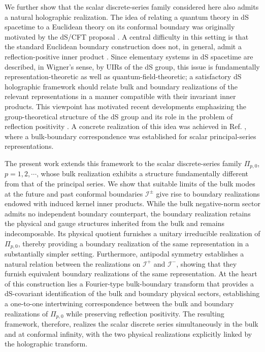 \documentclass[aps,twocolumn,nofootinbib]{revtex4}
\begin{document}
We further show that the scalar discrete-series family considered here also admits a natural holographic realization. The idea of relating a quantum theory in dS spacetime to a Euclidean theory on its conformal boundary was originally motivated by the dS/CFT proposal \cite{Strominger2001, Witten2001}. A central difficulty in this setting is that the standard Euclidean boundary construction does not, in general, admit a reflection-positive inner product \cite{Strominger2001, Bros2002}. Since elementary systems in dS spacetime are described, in Wigner's sense, by UIRs of the dS group, this issue is fundamentally representation-theoretic as well as quantum-field-theoretic; a satisfactory dS holographic framework should relate bulk and boundary realizations of the relevant representations in a manner compatible with their invariant inner products. This viewpoint has motivated recent developments emphasizing the group-theoretical structure of the dS group and its role in the problem of reflection positivity \cite{GazeauOlmoPejhan2024, 0001, 0002, 0003}. A concrete realization of this idea was achieved in Ref. \cite{GazeauOlmoPejhan2024}, where a bulk-boundary correspondence was established for scalar principal-series representations.

The present work extends this framework to the scalar discrete-series family $\Pi_{p,0}$, $p=1,2,\cdots$, whose bulk realization exhibits a structure fundamentally different from that of the principal series. We show that suitable limits of the bulk modes at the future and past conformal boundaries ${\mathcal{I}}^{\pm}$ give rise to boundary realizations endowed with induced kernel inner products. While the bulk negative-norm sector admits no independent boundary counterpart, the boundary realization retains the physical and gauge structures inherited from the bulk and remains indecomposable. Its physical quotient furnishes a unitary irreducible realization of $\Pi_{p,0}$, thereby providing a boundary realization of the same representation in a substantially simpler setting. Furthermore, antipodal symmetry establishes a natural relation between the realizations on ${\mathcal{I}}^{+}$ and ${\mathcal{I}}^{-}$, showing that they furnish equivalent boundary realizations of the same representation. At the heart of this construction lies a Fourier-type bulk-boundary transform that provides a dS-covariant identification of the bulk and boundary physical sectors, establishing a one-to-one intertwining correspondence between the bulk and boundary realizations of $\Pi_{p,0}$ while preserving reflection positivity. The resulting framework, therefore, realizes the scalar discrete series simultaneously in the bulk and at conformal infinity, with the two physical realizations explicitly linked by the holographic transform.
\end{document}
